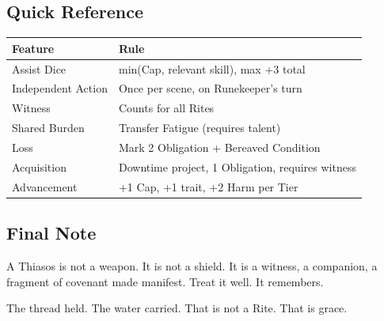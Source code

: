 \subsection{Quick Reference}

\begin{tabular}{ll}
\textbf{Feature} & \textbf{Rule} \\
\hline
Assist Dice & min(Cap, relevant skill), max +3 total \\
Independent Action & Once per scene, on Runekeeper's turn \\
Witness & Counts for all Rites \\
Shared Burden & Transfer Fatigue (requires talent) \\
Loss & Mark 2 Obligation + Bereaved Condition \\
Acquisition & Downtime project, 1 Obligation, requires witness \\
Advancement & +1 Cap, +1 trait, +2 Harm per Tier \\
\end{tabular}

\subsection{Final Note}

A Thiasos is not a weapon. It is not a shield. It is a witness, a companion, a fragment of covenant made manifest. Treat it well. It remembers.

The thread held. The water carried. That is not a Rite. That is grace.
